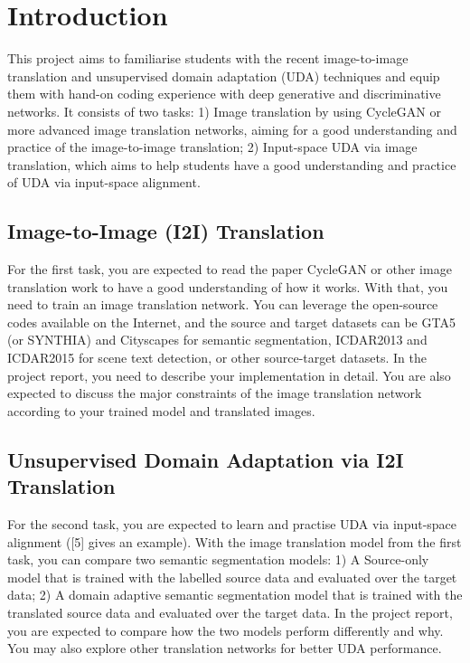 \section{Introduction}
This project aims to familiarise students with the recent image-to-image translation and unsupervised domain adaptation (UDA) techniques and equip them with hand-on coding experience with deep generative and discriminative networks. It consists of two tasks: 1) Image translation by using CycleGAN or more advanced image translation networks, aiming for a good understanding and practice of the image-to-image translation; 2) Input-space UDA via image translation, which aims to help students have a good understanding and practice of UDA via input-space alignment.

\subsection{Image-to-Image (I2I) Translation}
For the first task, you are expected to read the paper CycleGAN or other image translation work to have a good understanding of how it works. With that, you need to train an image translation network. You can leverage the open-source codes available on the Internet, and the source and target datasets can be GTA5 (or SYNTHIA) and Cityscapes for semantic segmentation, ICDAR2013 and ICDAR2015 for scene text detection, or other source-target datasets. In the project report, you need to describe your implementation in detail. You are also expected to discuss the major constraints of the image translation network according to your trained model and translated images.

\subsection{Unsupervised Domain Adaptation via I2I Translation}
For the second task, you are expected to learn and practise UDA via input-space alignment ([5] gives an example). With the image translation model from the first task, you can compare two semantic segmentation models: 1) A Source-only model that is trained with the labelled source data and evaluated over the target data; 2) A domain adaptive semantic segmentation model that is trained with the translated source data and evaluated over the target data. In the project report, you are expected to compare how the two models perform differently and why. You may also explore other translation networks for better UDA performance.

\newpage